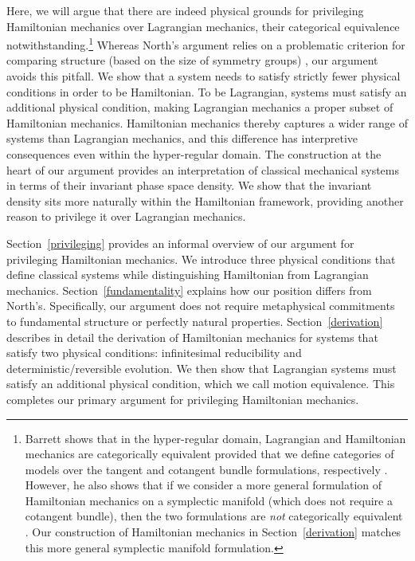 \documentclass[letterpaper]{article}
\begin{document}
Here, we will argue that there are indeed physical grounds for privileging Hamiltonian mechanics over Lagrangian mechanics, their categorical equivalence notwithstanding.\footnote{Barrett shows that in the hyper-regular domain, Lagrangian and Hamiltonian mechanics are categorically equivalent provided that we define categories of models over the tangent and cotangent bundle formulations, respectively \parencites*[1181-82]{Barrett2}. However, he also shows that if we consider a more general formulation of Hamiltonian mechanics on a symplectic manifold (which does not require a cotangent bundle), then the two formulations are \textit{not} categorically equivalent \parencites*[1182-83]{Barrett2}. Our construction of Hamiltonian mechanics in Section~\ref{derivation} matches this more general symplectic manifold formulation.} Whereas North's argument relies on a problematic criterion for comparing structure (based on the size of symmetry groups) \parencites[]{Swanson}, our argument avoids this pitfall. We show that a system needs to satisfy strictly fewer physical conditions in order to be Hamiltonian. To be Lagrangian, systems must satisfy an additional physical condition, making Lagrangian mechanics a proper subset of Hamiltonian mechanics. Hamiltonian mechanics thereby captures a wider range of systems than Lagrangian mechanics, and this difference has interpretive consequences even within the hyper-regular domain. The construction at the heart of our argument provides an interpretation of classical mechanical systems in terms of their invariant phase space density. We show that the invariant density sits more naturally within the Hamiltonian framework, providing another reason to privilege it over Lagrangian mechanics.

Section~\ref{privileging} provides an informal overview of our argument for privileging Hamiltonian mechanics. We introduce three physical conditions that define classical systems while distinguishing Hamiltonian from Lagrangian mechanics. Section~\ref{fundamentality} explains how our position differs from North's. Specifically, our argument does not require metaphysical commitments to fundamental structure or perfectly natural properties. Section~\ref{derivation} describes in detail the derivation of Hamiltonian mechanics for systems that satisfy two physical conditions: infinitesimal reducibility and deterministic/reversible evolution. We then show that Lagrangian systems must satisfy an additional physical condition, which we call motion equivalence. This completes our primary argument for privileging Hamiltonian mechanics.
\end{document}
